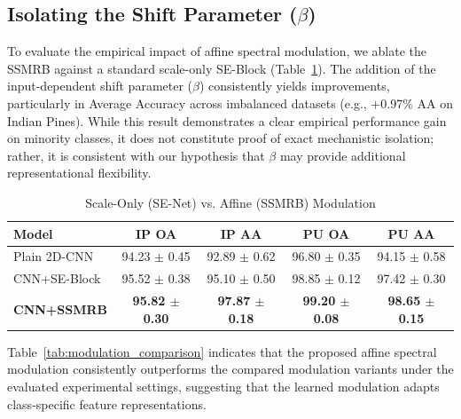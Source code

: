 \documentclass[pdflatex,sn-mathphys-num]{sn-jnl}
\theoremstyle{thmstyleone}
\theoremstyle{thmstyletwo}
\theoremstyle{thmstylethree}
\begin{document}
\subsection{Isolating the Shift Parameter ($\beta$)}
To evaluate the empirical impact of affine spectral modulation, we ablate the SSMRB against a standard scale-only SE-Block (Table~\ref{tab:senet_comparison}). The addition of the input-dependent shift parameter ($\beta$) consistently yields improvements, particularly in Average Accuracy across imbalanced datasets (e.g., +0.97\% AA on Indian Pines). While this result demonstrates a clear empirical performance gain on minority classes, it does not constitute proof of exact mechanistic isolation; rather, it is consistent with our hypothesis that $\beta$ may provide additional representational flexibility. 

\begin{table}[!t]
\caption{Scale-Only (SE-Net) vs. Affine (SSMRB) Modulation}
\label{tab:senet_comparison}
\centering

\begin{tabular}{lcccc}
\toprule
\textbf{Model} & \textbf{IP OA} & \textbf{IP AA} & \textbf{PU OA} & \textbf{PU AA} \\
\midrule
Plain 2D-CNN & 94.23 $\pm$ 0.45 & 92.89 $\pm$ 0.62 & 96.80 $\pm$ 0.35 & 94.15 $\pm$ 0.58 \\
CNN+SE-Block & 95.52 $\pm$ 0.38 & 95.10 $\pm$ 0.50 & 98.85 $\pm$ 0.12 & 97.42 $\pm$ 0.30 \\
\textbf{CNN+SSMRB} & \textbf{95.82 $\pm$ 0.30} & \textbf{97.87 $\pm$ 0.18} & \textbf{99.20 $\pm$ 0.08} & \textbf{98.65 $\pm$ 0.15} \\
\bottomrule
\end{tabular}
\end{table}

Table~\ref{tab:modulation_comparison} indicates that the proposed affine spectral modulation consistently outperforms the compared modulation variants under the evaluated experimental settings, suggesting that the learned modulation adapts class-specific feature representations.
\end{document}
